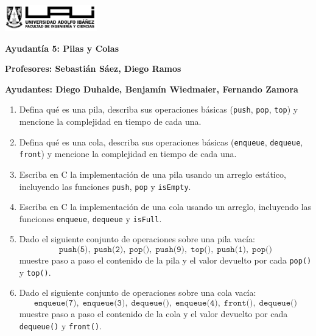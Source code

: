\documentclass[12pt]{article}
\begin{document}
    \begin{titlepage}
        \centering
        \includegraphics[width=0.3\textwidth]{../imgs/logo-uai-fic.png}
        
        \vspace{0.5cm}
        \textbf{\fontsize{12}{24} Ayudantía 5: Pilas y Colas}
        
        \vspace{0.5cm}
        \textbf{\fontsize{12}{24}\selectfont Profesores: Sebastián Sáez, Diego Ramos}
        
        \begin{center}
            \textbf{\fontsize{12}{24}\selectfont Ayudantes: Diego Duhalde, Benjamín Wiedmaier, Fernando Zamora}
        \end{center}

        \begin{enumerate}
            \item Defina qué es una pila, describa sus operaciones básicas (\texttt{push}, \texttt{pop}, \texttt{top}) y mencione la complejidad en tiempo de cada una.
            
            \item Defina qué es una cola, describa sus operaciones básicas (\texttt{enqueue}, \texttt{dequeue}, \texttt{front}) y mencione la complejidad en tiempo de cada una.
            
            \item Escriba en C la implementación de una pila usando un arreglo estático, incluyendo las funciones \texttt{push}, \texttt{pop} y \texttt{isEmpty}.
            
            \item Escriba en C la implementación de una cola usando un arreglo, incluyendo las funciones \texttt{enqueue}, \texttt{dequeue} y \texttt{isFull}.
            
            \item Dado el siguiente conjunto de operaciones sobre una pila vacía:
            \[
              \texttt{push(5)},\;\texttt{push(2)},\;\texttt{pop()},\;\texttt{push(9)},\;\texttt{top()},\;\texttt{push(1)},\;\texttt{pop()}
            \]
            muestre paso a paso el contenido de la pila y el valor devuelto por cada \texttt{pop()} y \texttt{top()}.

            \item Dado el siguiente conjunto de operaciones sobre una cola vacía:
            \[
              \texttt{enqueue(7)},\;\texttt{enqueue(3)},\;\texttt{dequeue()},\;\texttt{enqueue(4)},\;\texttt{front()},\;\texttt{dequeue()}
            \]
            muestre paso a paso el contenido de la cola y el valor devuelto por cada \texttt{dequeue()} y \texttt{front()}.
        \end{enumerate}
    \end{titlepage}
\end{document}
